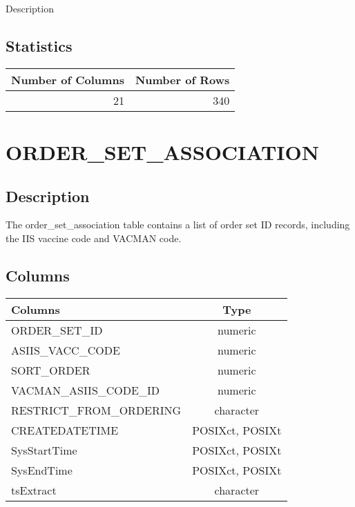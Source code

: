 \documentclass[
  letterpaper,
  DIV=11,
  numbers=noendperiod]{scrreprt}
\begin{document}
Description

\hypertarget{statistics-22}{%
\section*{Statistics}\label{statistics-22}}

\begin{longtable}{rr}
\toprule
Number of Columns & Number of Rows \\ 
\midrule
21 & 340 \\ 
\bottomrule
\end{longtable}

\hypertarget{order_set_association}{%
\chapter*{ORDER\_SET\_ASSOCIATION}\label{order_set_association}}

\hypertarget{description-23}{%
\section*{Description}\label{description-23}}

The order\_set\_association table contains a list of order set ID
records, including the IIS vaccine code and VACMAN code.

\hypertarget{columns-23}{%
\section*{Columns}\label{columns-23}}

\begin{longtable}{lc}
\toprule
Columns & Type \\ 
\midrule
ORDER\_SET\_ID & numeric \\ 
ASIIS\_VACC\_CODE & numeric \\ 
SORT\_ORDER & numeric \\ 
VACMAN\_ASIIS\_CODE\_ID & numeric \\ 
RESTRICT\_FROM\_ORDERING & character \\ 
CREATEDATETIME & POSIXct, POSIXt \\ 
SysStartTime & POSIXct, POSIXt \\ 
SysEndTime & POSIXct, POSIXt \\ 
tsExtract & character \\ 
\bottomrule
\end{longtable}
\end{document}
